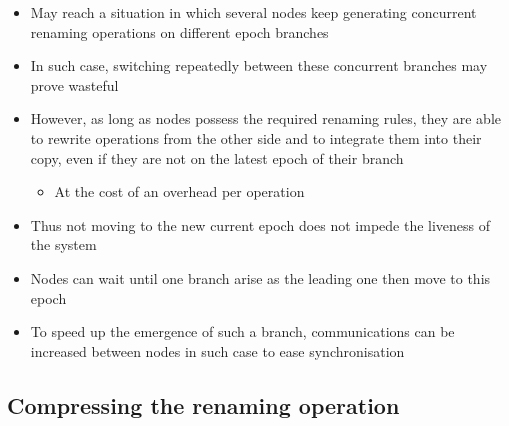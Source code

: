 \documentclass{article}
\begin{document}
\begin{itemize}
    \item May reach a situation in which several nodes keep generating concurrent renaming operations on different epoch branches
    \item In such case, switching repeatedly between these concurrent branches may prove wasteful 
    \item However, as long as nodes possess the required renaming rules, they are able to rewrite operations from the other side and to integrate them into their copy, even if they are not on the latest epoch of their branch
    \begin{itemize}
        \item At the cost of an overhead per operation
    \end{itemize}
    \item Thus not moving to the new current epoch does not impede the liveness of the system
    \item Nodes can wait until one branch arise as the leading one then move to this epoch
    \item To speed up the emergence of such a branch, communications can be increased between nodes in such case to ease synchronisation
\end{itemize}

\subsection{Compressing the renaming operation}
\end{document}
